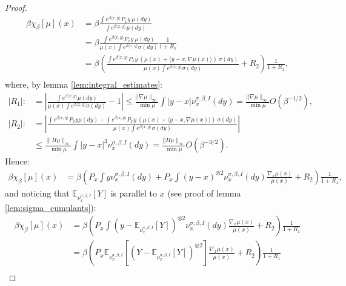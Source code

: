 \documentclass{article}
\numberwithin{theorem}{section}
\begin{document}
\begin{proof}
    \begin{align*}
        \beta\chi_\beta[\mu](x)&=\beta\frac{\int e^{\beta\langle x, y\rangle} P_xy\ \mu(dy)}{\int e^{\beta\langle x, y\rangle} \mu(dy)}\\
        &=\beta\frac{\int e^{\beta\langle x, y\rangle} P_xy\ \mu(dy)}{\mu(x)\int e^{\beta\langle x, y\rangle} \sigma(dy)}\frac{1}{1+R_1}\\
        &=\beta\left(\frac{\int e^{\beta\langle x, y\rangle} P_xy\ (\mu(x)+\langle y-x, \nabla \mu(x)\rangle)\ \sigma(dy)}{\mu(x) \int e^{\beta\langle x, y\rangle} \sigma(dy)}+R_2\right)\frac{1}{1+R_1},\\
    \end{align*}
    where, by lemma \ref{lem:integral_estimates}:
    \begin{equation}
    \label{eq:bh_reminders_bounds}
    \begin{aligned}
        |R_1|:&= \left|\frac{\int e^{\beta\langle x, y\rangle} \mu(dy)}{\mu(x)\int e^{\beta\langle x, y\rangle} \sigma(dy)}-1\right|\leq \frac{||\nabla\mu\|_\infty}{\min\mu}\int |y-x| \nu_x^{\sigma,\beta, I}(dy)=\frac{||\nabla\mu\|_\infty}{\min\mu}O(\beta^{-1/2}),\\
        |R_2|:&=\left|\frac{\int e^{\beta\langle x, y\rangle} P_xy\mu(dy)-\int e^{\beta\langle x, y\rangle} P_xy\ (\mu(x)+\langle y-x, \nabla \mu(x)\rangle)\ \sigma(dy)}{\mu(x)\int e^{\beta\langle x, y\rangle} \sigma(dy)}\right|\\&\leq \frac{\|H\mu\|_\infty}{\min \mu}\int |y-x|^3 \nu_x^{\sigma,\beta, I}(dy)=\frac{||H\mu\|_\infty}{\min\mu}O(\beta^{-3/2}).
    \end{aligned}
    \end{equation}
Hence:
 \begin{align*}
        \beta\chi_\beta[\mu](x)&=\beta\left(P_x \int y \nu_x^{\sigma,\beta, I}(dy)+P_x \int (y-x)^{\otimes 2} \nu_x^{\sigma,\beta, I}(dy) \frac{\nabla_x \mu(x)}{\mu(x)}+R_2\right)\frac{1}{1+R_1},
    \end{align*}
and noticing that $\mathbb{E}_{\nu_x^{\sigma,\beta, I}}[Y]$ is parallel to $x$ (see proof of lemma \ref{lem:sigma_cumulants}):
 \begin{align*}
        \beta\chi_\beta[\mu](x)&=\beta\left(P_x \int (y-\mathbb{E}_{\nu_x^{\sigma, \beta, I}}[Y])^{\otimes 2} \nu_x^{\sigma,\beta, I}(dy) \frac{\nabla_x \mu(x)}{\mu(x)}+R_2\right)\frac{1}{1+R_1}\\
        &=\beta\left(P_x \mathbb{E}_{\nu_x^{\sigma,\beta,I}} [(Y-\mathbb{E}_{\nu_x^{\sigma, \beta, I}}[Y])^{\otimes 2}] \frac{\nabla_x \mu(x)}{\mu(x)}+R_2\right)\frac{1}{1+R_1}\\

\end{align*}
\end{proof}
\end{document}
